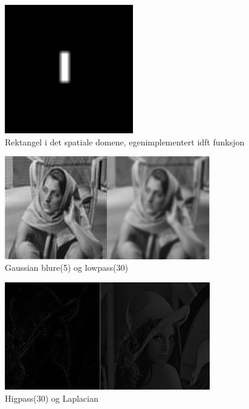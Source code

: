\documentclass[a4paper, 12pt]{article}
\begin{document}
\begin{figure}[h]
  \centering
  \includegraphics[width=0.5\textwidth]{images/idft-rektangel}
  \caption{Rektangel i det spatiale domene, egenimplementert idft funksjon}
  \label{fig:idft}
\end{figure}


\begin{figure}[h]
  \centering
  \includegraphics[width=0.8\textwidth]{images/barbara-gaussian-lowpass.png}
  \caption{Gaussian blure(5) og lowpass(30)}
  \label{fig:bgl}
\end{figure}


\begin{figure}[h]
  \centering
  \includegraphics[width=0.8\textwidth]{images/lena-highpass-laplacian.png}
  \caption{Higpass(30) og Laplacian}
  \label{fig:lhl}
\end{figure}
\end{document}

